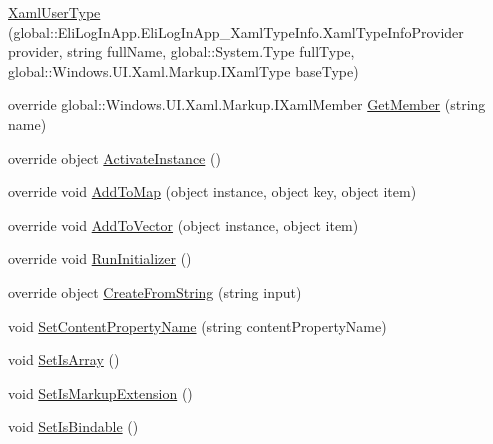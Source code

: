 \begin{DoxyCompactItemize}
\item 
\hyperlink{class_eli_log_in_app_1_1_eli_log_in_app___xaml_type_info_1_1_xaml_user_type_aead17ccf55a45757a3f89915c58ff296}{Xaml\+User\+Type} (global\+::\+Eli\+Log\+In\+App.\+Eli\+Log\+In\+App\+\_\+\+Xaml\+Type\+Info.\+Xaml\+Type\+Info\+Provider provider, string full\+Name, global\+::\+System.\+Type full\+Type, global\+::\+Windows.\+U\+I.\+Xaml.\+Markup.\+I\+Xaml\+Type base\+Type)
\item 
override global\+::\+Windows.\+U\+I.\+Xaml.\+Markup.\+I\+Xaml\+Member \hyperlink{class_eli_log_in_app_1_1_eli_log_in_app___xaml_type_info_1_1_xaml_user_type_ace8732f899047742b6d12a0266060652}{Get\+Member} (string name)
\item 
override object \hyperlink{class_eli_log_in_app_1_1_eli_log_in_app___xaml_type_info_1_1_xaml_user_type_a318677d00a320935c3ecf51ec8b0425d}{Activate\+Instance} ()
\item 
override void \hyperlink{class_eli_log_in_app_1_1_eli_log_in_app___xaml_type_info_1_1_xaml_user_type_a39e9eebc47fc7506686650e59ce7d956}{Add\+To\+Map} (object instance, object key, object item)
\item 
override void \hyperlink{class_eli_log_in_app_1_1_eli_log_in_app___xaml_type_info_1_1_xaml_user_type_ad2a78d104d13536ed77b5d74c52d21af}{Add\+To\+Vector} (object instance, object item)
\item 
override void \hyperlink{class_eli_log_in_app_1_1_eli_log_in_app___xaml_type_info_1_1_xaml_user_type_ae66b79ba8e704f9f662faa257e17fe7e}{Run\+Initializer} ()
\item 
override object \hyperlink{class_eli_log_in_app_1_1_eli_log_in_app___xaml_type_info_1_1_xaml_user_type_a2ca01ffd5253dcc80ff2fbeb81509bbe}{Create\+From\+String} (string input)
\item 
void \hyperlink{class_eli_log_in_app_1_1_eli_log_in_app___xaml_type_info_1_1_xaml_user_type_adff0109146860359f64270e126c7ff45}{Set\+Content\+Property\+Name} (string content\+Property\+Name)
\item 
void \hyperlink{class_eli_log_in_app_1_1_eli_log_in_app___xaml_type_info_1_1_xaml_user_type_ad15c17048ffacdb0216e1aeb91305f75}{Set\+Is\+Array} ()
\item 
void \hyperlink{class_eli_log_in_app_1_1_eli_log_in_app___xaml_type_info_1_1_xaml_user_type_a5dad4447cab162df2a7f440d1d2b3103}{Set\+Is\+Markup\+Extension} ()
\item 
void \hyperlink{class_eli_log_in_app_1_1_eli_log_in_app___xaml_type_info_1_1_xaml_user_type_ad54def0c9c9ef0a07f42548f895f38d9}{Set\+Is\+Bindable} ()

\end{DoxyCompactItemize}
